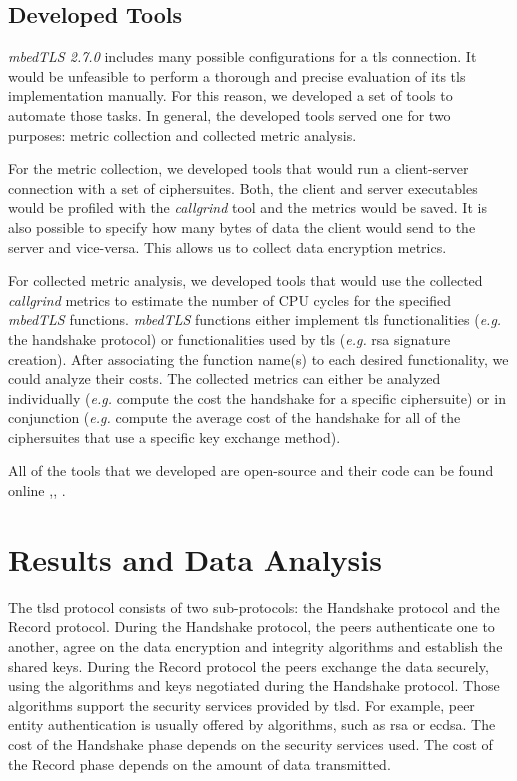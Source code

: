\documentclass{llncs}
\begin{document}
\subsection{Developed Tools}

\textit{mbedTLS 2.7.0} includes many possible configurations for a \gls{tls} connection. It would be unfeasible to
perform a thorough and precise evaluation of its \gls{tls} implementation manually. For this reason, we developed a set
of tools to automate those tasks. In general, the developed tools served one for two purposes: metric collection and
collected metric analysis.

For the metric collection, we developed tools that would run a client-server connection with a set of ciphersuites.
Both, the client and server executables would be profiled with the \textit{callgrind} tool and the metrics would be saved.
It is also possible to specify how many bytes of data the client would send to the server and vice-versa.
This allows us to collect data encryption metrics.

For collected metric analysis, we developed tools that would use the collected \textit{callgrind} metrics to estimate the
number of CPU cycles for the specified \textit{mbedTLS} functions. \textit{mbedTLS} functions either implement \gls{tls} functionalities
(\textit{e.g.} the handshake protocol) or functionalities used by \gls{tls} (\textit{e.g.} \gls{rsa} signature creation).
After associating the function name(s) to each desired functionality, we could analyze their costs. The collected metrics can either
be analyzed individually (\textit{e.g.} compute the cost the handshake for a specific ciphersuite) or in conjunction (\textit{e.g.}
compute the average cost of the handshake for all of the ciphersuites that use a specific key exchange method).

All of the tools that we developed are open-source and their code can be found online \cite{iluxonch23:online},\cite{iluxonch44:online}, \cite{iluxonch73:online}.


\section{Results and Data Analysis}

The \gls{tlsd} protocol consists of two sub-protocols: the Handshake protocol and the Record protocol.
During the Handshake protocol, the peers authenticate one to another, agree on the data encryption and integrity
algorithms and establish the shared keys. During the Record protocol the peers exchange the data securely,
using the algorithms and keys negotiated during the Handshake protocol. Those algorithms support the security
services provided by \gls{tlsd}. For example, peer entity authentication is usually offered by algorithms, such
as \gls{rsa} or \gls{ecdsa}. The cost of the Handshake phase depends on the security services used. The cost
of the Record phase depends on the amount of data transmitted.
\end{document}
